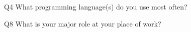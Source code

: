 \begin{description}%
\item{Q4} What programming language(s) do you use most often?%
\item{Q8} What is your major role at your place of work?%
\end{description}%
